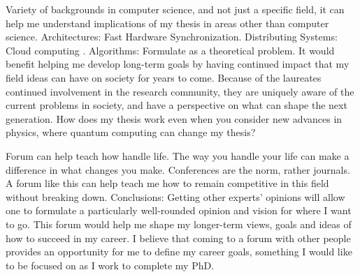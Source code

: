 {\begin{frame}
\begin{outline}[enumerate]
\tiny \1 {\tiny  Variety of backgrounds in computer science, and not
  just a specific field, it can help me understand implications of my
  thesis in areas other than computer science.} 
\tiny \2 {\tiny Architectures: Fast Hardware Synchronization. }  
\tiny \2  {\tiny Distributing Systems: Cloud computing .} 
\tiny \2 {\tiny Algorithms: Formulate as a theoretical problem. } 
\tiny \1 {\tiny It would benefit helping me develop long-term goals
  by having continued impact that my field ideas can have on society
  for years to come.} 
\tiny \2 {\tiny Because of the laureates continued involvement in the
  research community, they are uniquely aware of the current problems
  in society, and have a perspective on what can shape the next
  generation.}
\tiny \2 {\tiny How does my thesis work even when you consider new advances in physics, where quantum computing can change my thesis?} 

\tiny \1 {\tiny Forum can help teach how handle life.} 
\tiny \2 {\tiny The way you handle your life can make a difference in what changes you make.} 
\tiny \2 {\tiny Conferences are the norm, rather journals.} 
\tiny \2 {\tiny  A forum like this can help teach me how to remain competitive in this field without breaking down.} 
\tiny \1 {\tiny Conclusions:}
\tiny \2 {\tiny Getting other experts’ opinions will allow one to formulate a
particularly well-rounded opinion and vision for where I want to go.} 
\tiny \2 {\tiny This forum would help me shape my longer-term views, goals and
ideas of how to succeed in my career.} 
\tiny \2 {\tiny I believe that coming to a forum with other people 
  provides an opportunity for me to define my career goals, something
  I would like to be focused on as I work to complete my PhD.} 
\end{outline} 



\end{frame} 
}

